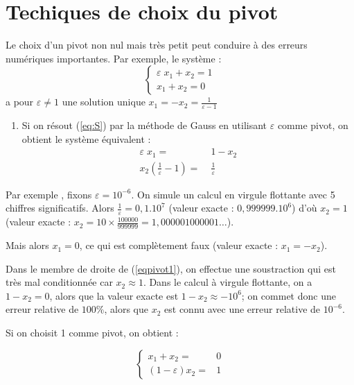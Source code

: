 \section{Techiques de choix du pivot}

Le choix d'un pivot non nul mais très petit peut conduire à des erreurs numériques importantes.
Par exemple, le système :
\begin{equation*}
    \left\lbrace
    \begin{array}{c}
        \varepsilon \; x_1 + x_2 = 1 \\
        x_1 + x_2 = 0 
    \end{array} \right.
\end{equation*}
a pour $\varepsilon \ne 1$ une solution unique $x_1 = -x_2 = \displaystyle\frac{1}{\varepsilon - 1}$

\begin{enumerate}[label=-]
    \item Si on résout (\ref{eq:S}) par la méthode de Gauss en utilisant $\varepsilon$ comme
        pivot, on obtient le système équivalent :
            \begin{align}
                \label{eqpivot1}
                \varepsilon \; x_1 = \; & 1 - x_2  \\
                x_2 (\frac{1}{\varepsilon} - 1) = \; & \frac{1}{\varepsilon} 
                \label{eqpivot2}
            \end{align}
\end{enumerate}

Par exemple , fixons $\varepsilon = 10^{-6}$. On simule un calcul
en virgule flottante avec 5 chiffres significatifs. Alors
$\frac{1}{\varepsilon} = 0,1.10^{7}$ (valeur exacte : $0,999999.10^6$)
d'où $x_2 = 1$ (valeur exacte : $x_2 = 10 \times \frac{100000}{999999} = 1,000001000001\dots$).

Mais alors $x_1 = 0$, ce qui est complètement faux (valeur exacte :
$x_1 = -x_2$).

Dans le membre de droite de (\ref{eqpivot1}), on effectue une 
soustraction qui est très mal conditionnée car $x_2 \approx 1$. Dans le calcul à
virgule flottante, on a $1 - x_2 = 0$, alors que la valeur exacte est 
$1 - x_2 \approx - 10^6$; on commet donc une erreur relative de $100 \%$,
alors que $x_2$ est connu avec une erreur relative de $10^{-6}$.

Si on choisit 1 comme pivot, on obtient :

\begin{equation*}
     \left \lbrace
     \begin{array}{ccc}
         x_1 + x_2  = & 0 \\[7pt]
         (1 - \varepsilon) x_2  = & 1
     \end{array}
     \right.
\end{equation*}

